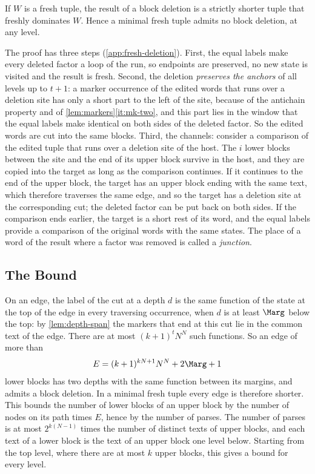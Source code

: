 

\begin{theorem}\label{thm:block-deletion}
If $W$ is a fresh tuple, the result of a block deletion is a strictly
shorter tuple that freshly dominates $W$. Hence a minimal fresh tuple admits
no block deletion, at any level.
\end{theorem}

The proof has three steps (\cref{app:fresh-deletion}). First, the equal
labels make every deleted factor a loop of the run, so endpoints are
preserved, no new state is visited and the result is fresh. Second, the
deletion \emph{preserves the anchors} of all levels up to $t+1$: a marker
occurrence of the edited words that runs over a deletion site has only a
short part to the left of the site, because of the antichain property and of
\cref{lem:markers}\eqref{it:mk-two}, and this part lies in the window that
the equal labels make identical on both sides of the deleted factor. So the
edited words are cut into the same blocks. Third, the channels: consider a
comparison of the edited tuple that runs over a deletion site of the host.
The $i$ lower blocks between the site and the end of its upper block survive
in the host, and they are copied into the target as long as the comparison
continues. If it continues to the end of the upper block, the target has an
upper block ending with the same text, which therefore traverses the same
edge, and so the target has a deletion site at the corresponding cut; the
deleted factor can be put back on both sides. If the comparison ends earlier,
the target is a short rest of its word, and the equal labels provide a
comparison of the original words with the same states. The place of a word
of the result where a factor was removed is called a \emph{junction}.

\subsection{The Bound}\label{sec:fresh-bound}

On an edge, the label of the cut at a depth $d$ is the same function of the
state at the top of the edge in every traversing occurrence, when $d$ is at
least $\Marg$ below the top: by \cref{lem:depth-span} the markers that end
at this cut lie in the common text of the edge. There are at most
$(k+1)^tN^N$ such functions. So an edge of more than
\[
  E=(k+1)^{kN+1}N^N+2\Marg+1
\]
lower blocks has two depths with the same function between its margins, and
admits a block deletion. In a minimal fresh tuple every edge is therefore
shorter. This bounds the number of lower blocks of an upper block by the
number of nodes on its path times $E$, hence by the number of parses. The
number of parses is at most $2^{k(N-1)}$ times the number of distinct texts
of upper blocks, and each text of a lower block is the text of an upper
block one level below. Starting from the top level, where there are at most
$k$ upper blocks, this gives a bound for every level.

